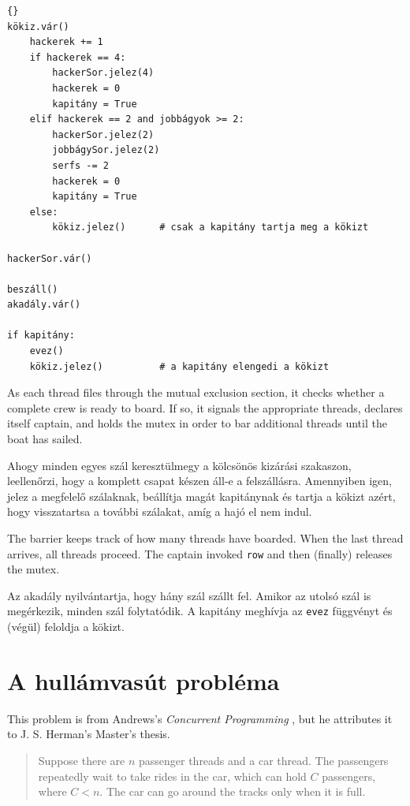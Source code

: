 \documentclass{book}
\newcommand{\clearemptydoublepage}{\newpage\cleardoublepage}
\begin{document}
\begin{lstlisting}[title={River crossing solution}]{}
kökiz.vár()
    hackerek += 1
    if hackerek == 4:
        hackerSor.jelez(4)                
        hackerek = 0
        kapitány = True
    elif hackerek == 2 and jobbágyok >= 2:
        hackerSor.jelez(2)                
        jobbágySor.jelez(2)                  
        serfs -= 2
        hackerek = 0
        kapitány = True
    else:
        kökiz.jelez()      # csak a kapitány tartja meg a kökizt

hackerSor.vár()           

beszáll()
akadály.vár()            

if kapitány:
    evez()
    kökiz.jelez()          # a kapitány elengedi a kökizt
\end{lstlisting}

As each thread files through the mutual exclusion section, it
checks whether a complete crew is ready to board.  If so, it
signals the appropriate threads, declares itself captain, and
holds the mutex in order to bar additional threads until the
boat has sailed.

Ahogy minden egyes szál keresztülmegy a kölcsönös kizárási szakaszon,
leellenőrzi, hogy a komplett csapat készen áll-e a felszállásra.
Amennyiben igen, jelez a megfelelő szálaknak, beállítja magát
kapitánynak és tartja a kökizt azért, hogy visszatartsa a további
szálakat, amíg a hajó el nem indul.

The barrier keeps track of how many threads have boarded.
When the last thread arrives, all threads proceed.
The captain invoked {\tt row} and then (finally) releases the mutex.

Az akadály nyilvántartja, hogy hány szál szállt fel. Amikor az utolsó
szál is megérkezik, minden szál folytatódik. A kapitány meghívja az {\tt evez}
függvényt és (végül) feloldja a kökizt.

\clearemptydoublepage
\section{A hullámvasút probléma}

This problem is from Andrews's {\em Concurrent
Programming} \cite{andrews}, but he attributes it to J. S. Herman's
Master's thesis.

\begin{quotation}
Suppose there are $n$ passenger threads and a car thread.  The passengers
repeatedly wait to take rides in the car, which can hold $C$ passengers,
where $C<n$.  The car can go around the tracks only when it is full.
\end{quotation}
\end{document}
